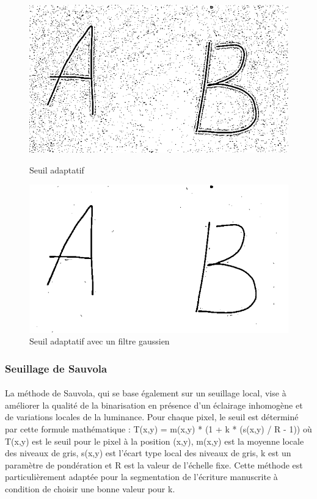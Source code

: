 \documentclass[a4paper]{article}
\begin{document}
				\begin{figure}[h]
					\centering
					\begin{minipage}{.5\textwidth}
					  \centering
					  \includegraphics[width=.8\linewidth]{seuilAdaptatif.png}
					  \caption{Seuil adaptatif}
					  \label{fig:seuillageAdaptatif}
					\end{minipage}%
					\begin{minipage}{.5\textwidth}
					  \centering
					  \includegraphics[width=.8\linewidth]{seuilAdaptatifGauss.png}
					  \caption{Seuil adaptatif avec un filtre gaussien}
					  \label{fig:seuillageAdaptatifEtGauss}
					\end{minipage}
				\end{figure}


				

				\subsubsection{Seuillage de Sauvola}
				\paragraph{} La méthode de Sauvola, qui se base également sur un seuillage local, vise à améliorer la qualité de la binarisation en présence d'un éclairage inhomogène et de variations locales de la luminance. Pour chaque pixel, le seuil est déterminé par cette formule mathématique :
							T(x,y) = m(x,y) * (1 + k * (s(x,y) / R - 1))
				où T(x,y) est le seuil pour le pixel à la position (x,y), m(x,y) est la moyenne locale des niveaux de gris, s(x,y) est l'écart type local des niveaux de gris, k est un paramètre de pondération et R est la valeur de l'échelle fixe.
				Cette méthode est particulièrement adaptée pour la segmentation de l'écriture manuscrite à condition de choisir une bonne valeur pour k. 
\end{document}
